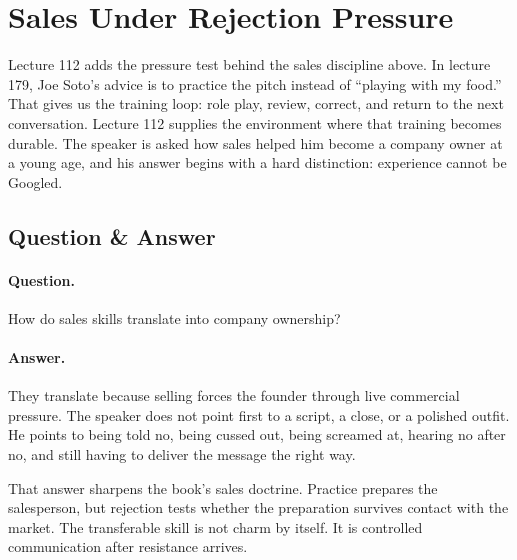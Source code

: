 \documentclass[11pt,oneside]{book}
\begin{document}
\section{Sales Under Rejection Pressure}

Lecture 112 adds the pressure test behind the sales discipline above. In lecture 179, Joe Soto's advice is to practice the pitch instead of ``playing with my food.'' That gives us the training loop: role play, review, correct, and return to the next conversation. Lecture 112 supplies the environment where that training becomes durable. The speaker is asked how sales helped him become a company owner at a young age, and his answer begins with a hard distinction: experience cannot be Googled.

\subsection{Question \& Answer}

\paragraph{Question.}
How do sales skills translate into company ownership?

\paragraph{Answer.}
They translate because selling forces the founder through live commercial pressure. The speaker does not point first to a script, a close, or a polished outfit. He points to being told no, being cussed out, being screamed at, hearing no after no, and still having to deliver the message the right way.

That answer sharpens the book's sales doctrine. Practice prepares the salesperson, but rejection tests whether the preparation survives contact with the market. The transferable skill is not charm by itself. It is controlled communication after resistance arrives.
\end{document}

